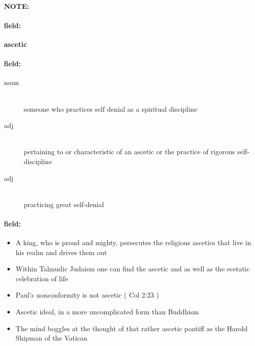 \documentclass[12pt]{article}
\newenvironment{note}{\paragraph{NOTE:}}{}
\newenvironment{field}{\paragraph{field:}}{}
\begin{document}
\begin{note}
\begin{field}
\textbf{\large ascetic}
\end{field}


\begin{field}
\begin{description}
\item[noun] \hfill \\ 
someone who practices self denial as a spiritual discipline

\item[adj] \hfill \\ 
pertaining to or characteristic of an ascetic or the practice of rigorous self-discipline

\item[adj] \hfill \\ 
practicing great self-denial

\end{description}
\end{field}

\begin{field}
\begin{itemize}
\item A king, who is proud and mighty, persecutes the religious ascetics that live in his realm and drives them out
\item Within Talmudic Judaism one can find the ascetic and as well as the ecstatic celebration of life
\item Paul's nonconformity is not ascetic ( Col 2:23 )
\item Ascetic ideal, in a more uncomplicated form than Buddhism
\item The mind boggles at the thought of that rather ascetic pontiff as the Harold Shipman of the Vatican
\end{itemize}
\end{field}
\end{note}
\end{document}

